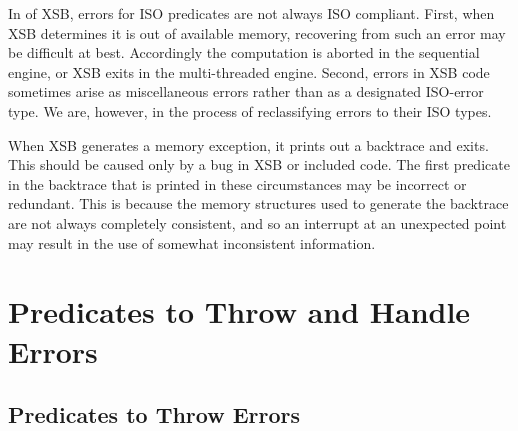 In \version{} of XSB, errors for ISO predicates are not always ISO
compliant.  First, when XSB determines it is out of available memory,
recovering from such an error may be difficult at best.  Accordingly
the computation is aborted in the sequential engine, or XSB exits in
the multi-threaded engine.  Second, errors in XSB code sometimes arise
as miscellaneous errors rather than as a designated ISO-error type.
We are, however, in the process of reclassifying errors to their ISO
types.

When XSB generates a memory exception, it prints out a backtrace and
exits.  This should be caused only by a bug in XSB or included code.
The first predicate in the backtrace that is printed in these
circumstances may be incorrect or redundant.  This is because the
memory structures used to generate the backtrace are not always
completely consistent, and so an interrupt at an unexpected point may
result in the use of somewhat inconsistent information.

\section{Predicates to Throw and Handle Errors}
\label{sec:errorpredicates}

\subsection{Predicates to Throw Errors}

